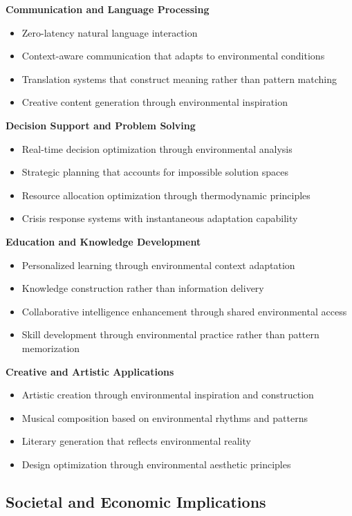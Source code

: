 \documentclass[12pt,a4paper]{article}
\begin{document}
\textbf{Communication and Language Processing}
\begin{itemize}
\item Zero-latency natural language interaction
\item Context-aware communication that adapts to environmental conditions
\item Translation systems that construct meaning rather than pattern matching
\item Creative content generation through environmental inspiration
\end{itemize}

\textbf{Decision Support and Problem Solving}
\begin{itemize}
\item Real-time decision optimization through environmental analysis
\item Strategic planning that accounts for impossible solution spaces
\item Resource allocation optimization through thermodynamic principles
\item Crisis response systems with instantaneous adaptation capability
\end{itemize}

\textbf{Education and Knowledge Development}
\begin{itemize}
\item Personalized learning through environmental context adaptation
\item Knowledge construction rather than information delivery
\item Collaborative intelligence enhancement through shared environmental access
\item Skill development through environmental practice rather than pattern memorization
\end{itemize}

\textbf{Creative and Artistic Applications}
\begin{itemize}
\item Artistic creation through environmental inspiration and construction
\item Musical composition based on environmental rhythms and patterns
\item Literary generation that reflects environmental reality
\item Design optimization through environmental aesthetic principles
\end{itemize}

\subsection{Societal and Economic Implications}
\end{document}
